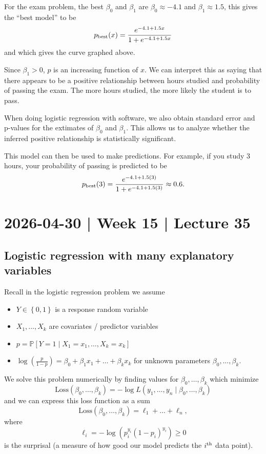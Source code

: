 \documentclass[10pt]{article}
\theoremstyle{definition}
\newcommand{\1}[1]{\textbf{1}_{\left[#1\right]}} %
\def\P{\mathbb{P}} %
\begin{document}
For the exam problem, the best $\beta_{0}$ and $\beta_{1}$ are $\beta_{0} \approx -4.1$ and
$\beta_{1}\approx 1.5$, this gives the ``best model'' to be
\begin{equation*}
  p_{\rm best}(x) = \frac{e^{-4.1+1.5x}}{1+e^{-4.1+1.5x}}
\end{equation*}
and which gives the curve graphed above.

Since $\beta_{1}>0$, $p$ is an increasing function of $x$. We can interpret
this as saying that there appears to be a positive relationship between hours
studied and probability of passing the exam. The more hours studied, the more
likely the student is to pass.

When doing logistic regression with software, we also obtain standard error
and p-values for the extimates of $\beta_{0}$ and $\beta_{1}$. This allows us
to analyze whether the inferred positive relationship is statistically
significant.

This model can then be used to make predictions. For example, if you study 3
hours, your probability of passing is predicted to be
\begin{equation*}
  p_{\rm best}(3) = \frac{e^{-4.1+1.5(3)}}{1+e^{-4.1+1.5(3)}} \approx 0.6.
\end{equation*}

\newpage
\section{2026-04-30 | Week 15 | Lecture 35}
\subsection{Logistic regression with many explanatory variables}
Recall in the logistic regression problem we assume
\begin{itemize}
  \item $Y\in \left\{0,1\right\}$ is a response random variable 
  \item $X_{1},\ldots,X_{k}$ are covariates / predictor variables
  \item $p = \P\left[Y=1\mid X_{1}=x_{1},\ldots,X_{k}=x_{k} \right]$
  \item $\log \left( \frac{p}{1-p} \right)=
  \beta_{0}+\beta_{1}x_{1}+\ldots+\beta_{k}x_{k}$ for unknown parameters $\beta_{0},\ldots,\beta_{k}$.
\end{itemize}
We solve this problem numerically by finding values for
$\beta_{0},\ldots,\beta_{k}$ which minimize
\begin{equation*}
  \text{Loss}(\beta_{0},\ldots,\beta_{k}) = -\log L(y_{1},\ldots,y_{n}\mid \beta_{0},\ldots,\beta_{k})
\end{equation*}
and we can express this loss function as a sum
\begin{equation*}
  \text{Loss}(\beta_{0},\ldots,\beta_{k}) = \ell_{1}+\ldots+\ell_{n},
\end{equation*}
where
\begin{equation*}
  \ell_{i} = -\log(p_{i}^{y_{i}}(1-p_{i})^{y_{i}}) \geq 0
\end{equation*}
is the surprisal (a measure of how good our model predicts the $i^{\rm th}$
data point).
\end{document}
